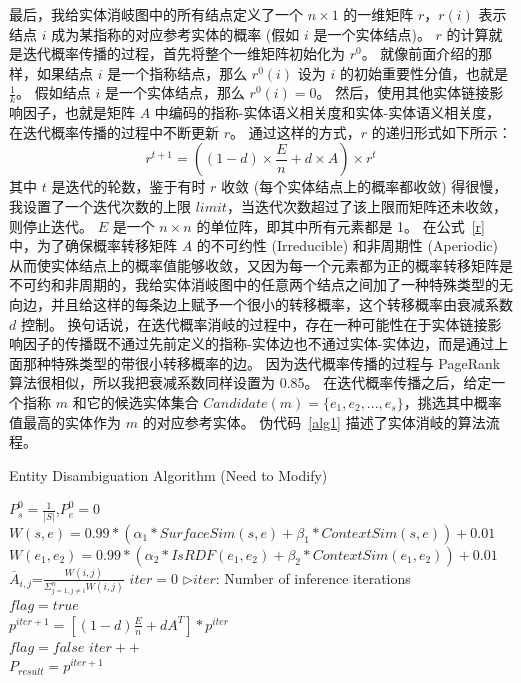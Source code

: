 最后，我给实体消岐图中的所有结点定义了一个 $n \times 1$ 的一维矩阵 $r$，$r(i)$ 表示结点 $i$ 成为某指称的对应参考实体的概率 (假如 $i$ 是一个实体结点)。
$r$ 的计算就是迭代概率传播的过程，首先将整个一维矩阵初始化为 $r^0$。
就像前面介绍的那样，如果结点 $i$ 是一个指称结点，那么 $r^0(i)$ 设为 $i$ 的初始重要性分值，也就是 $\frac{1}{k}$。
假如结点 $i$ 是一个实体结点，那么 $r^0(i)=0$。
然后，使用其他实体链接影响因子，也就是矩阵 $A$ 中编码的指称-实体语义相关度和实体-实体语义相关度，在迭代概率传播的过程中不断更新 $r$。
通过这样的方式，$r$ 的递归形式如下所示：
\begin{equation}
r^{t+1}=((1-d) \times \frac{E}{n} + d \times A) \times r^t
\label{r}
\end{equation}
其中 $t$ 是迭代的轮数，鉴于有时 $r$ 收敛 (每个实体结点上的概率都收敛) 得很慢，我设置了一个迭代次数的上限 $limit$，当迭代次数超过了该上限而矩阵还未收敛，则停止迭代。
$E$ 是一个 $n \times n$ 的单位阵，即其中所有元素都是 1。
在公式~\ref{r} 中，为了确保概率转移矩阵 $A$ 的不可约性 (Irreducible) 和非周期性 (Aperiodic) 从而使实体结点上的概率值能够收敛，又因为每一个元素都为正的概率转移矩阵是不可约和非周期的\cite{tauchen1986finite}，我给实体消岐图中的任意两个结点之间加了一种特殊类型的无向边，并且给这样的每条边上赋予一个很小的转移概率，这个转移概率由衰减系数 $d$ 控制。
换句话说，在迭代概率消岐的过程中，存在一种可能性在于实体链接影响因子的传播既不通过先前定义的指称-实体边也不通过实体-实体边，而是通过上面那种特殊类型的带很小转移概率的边。
因为迭代概率传播的过程与 PageRank\cite{page1999pagerank} 算法很相似，所以我把衰减系数同样设置为 0.85。
在迭代概率传播之后，给定一个指称 $m$ 和它的候选实体集合 $Candidate(m)=\{e_1, e_2, ..., e_s\}$，挑选其中概率值最高的实体作为 $m$ 的对应参考实体。
伪代码~\ref{alg1} 描述了实体消岐的算法流程。\par

\begin{algorithm}
\caption{Entity Disambiguation Algorithm (Need to Modify)\label{alg1}}
    {
        $P_s^0=\frac{1}{|S|}$,$P_e^0=0$
    }
    {
        {   
            $W(s,e)=0.99*(\alpha_1*SurfaceSim(s,e)+\beta_1*ContextSim(s,e))+0.01$
        }
    }
    {
        {
            $W(e_1,e_2)=0.99*(\alpha_2*IsRDF(e_1,e_2)+\beta_2*ContextSim(e_1,e_2))+0.01$
        }
    }
    {
        {
            $\overline{A}_{i,j}$=$\frac{W(i,j)}{\Sigma^n_{j=1,j\not=i}W(i,j)}$
        }
    }
    $iter=0$ \hfill $\triangleright iter$: Number of inference iterations\\
    $flag=true$\\
    {
        $p^{iter+1}=[(1-d)\frac{E}{n}+dA^T]*p^{iter}$\\
        {
            $flag = false$
        }
        $iter++$\\
    }
    $P_{result}=p^{iter+1}$
\end{algorithm}

